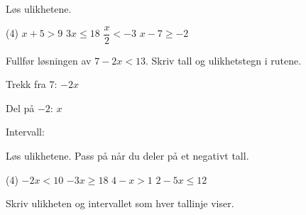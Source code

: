 
Løs ulikhetene.
\begin{tasks}(4)
  \task $x + 5 > 9$
  \task $3x \le 18$
  \task $\dfrac{x}{2} < -3$
  \task $x - 7 \ge -2$
\end{tasks}

Fullfør løsningen av $7 - 2x < 13$. Skriv tall og ulikhetstegn i rutene.

\medskip
Trekk fra 7: \quad $-2x$ \rute\ \rute

Del på $-2$: \quad $x$ \rute\ \rute

Intervall: \skrivlinje[3cm]

Løs ulikhetene. Pass på når du deler på et negativt tall.
\begin{tasks}(4)
  \task $-2x < 10$
  \task $-3x \ge 18$
  \task $4 - x > 1$
  \task $2 - 5x \le 12$
\end{tasks}

Skriv ulikheten og intervallet som hver tallinje viser.

